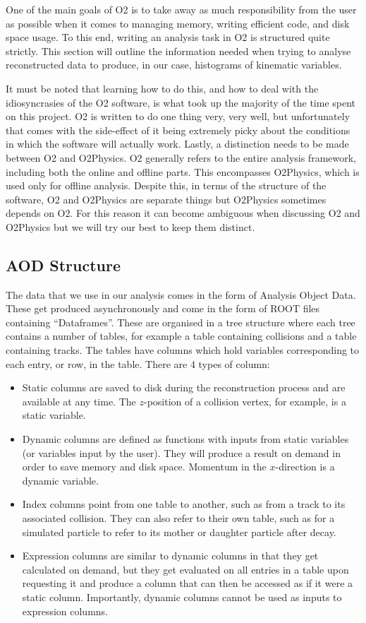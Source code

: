 One of the main goals of O2 is to take away as much responsibility from the user as possible when it comes to managing memory, writing efficient code, and disk space usage. To this end, writing an analysis task in O2 is structured quite strictly. This section will outline the information needed when trying to analyse reconstructed data to produce, in our case, histograms of kinematic variables. 

It must be noted that learning how to do this, and how to deal with the idiosyncrasies of the O2 software, is what took up the majority of the time spent on this project. O2 is written to do one thing very, very well, but unfortunately that comes with the side-effect of it being extremely picky about the conditions in which the software will actually work. Lastly, a distinction needs to be made between O2 and O2Physics. O2 generally refers to the entire analysis framework, including both the online and offline parts. This encompasses O2Physics, which is used only for offline analysis. Despite this, in terms of the structure of the software, O2 and O2Physics are separate things but O2Physics sometimes depends on O2. For this reason it can become ambiguous when discussing O2 and O2Physics but we will try our best to keep them distinct. 

\subsection{AOD Structure}\label{sec:AODStructure}
The data that we use in our analysis comes in the form of Analysis Object Data. These get produced asynchronously and come in the form of ROOT files containing ``Dataframes''. These are organised in a tree structure where each tree contains a number of tables, for example a table containing collisions and a table containing tracks. The tables have columns which hold variables corresponding to each entry, or row, in the table. There are 4 types of column:

\begin{itemize}
    \item Static columns are saved to disk during the reconstruction process and are available at any time. The $z$-position of a collision vertex, for example, is a static variable.
    \item Dynamic columns are defined as functions with inputs from static variables (or variables input by the user). They will produce a result on demand in order to save memory and disk space. Momentum in the $x$-direction is a dynamic variable.
    \item Index columns point from one table to another, such as from a track to its associated collision. They can also refer to their own table, such as for a simulated particle to refer to its mother or daughter particle after decay.
    \item Expression columns are similar to dynamic columns in that they get calculated on demand, but they get evaluated on all entries in a table upon requesting it and produce a column that can then be accessed as if it were a static column. Importantly, dynamic columns cannot be used as inputs to expression columns.
\end{itemize}

